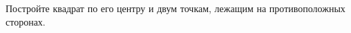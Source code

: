 \begin{ex}
	\begin{condition}
		Постройте квадрат по его центру и двум точкам, лежащим на противоположных сторонах.
	\end{condition}
\end{ex}